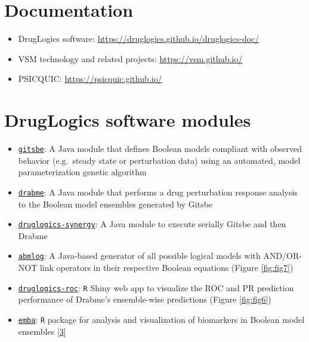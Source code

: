 \documentclass[
  12pt,
]{book}
\providecommand{\tightlist}{%
  \setlength{\itemsep}{0pt}\setlength{\parskip}{0pt}}
\begin{document}
\hypertarget{doc-links}{%
\section*{Documentation}\label{doc-links}}

\begin{itemize}
\tightlist
\item
  DrugLogics software: \url{https://druglogics.github.io/druglogics-doc/}
\item
  VSM technology and related projects: \url{https://vsm.github.io/}
\item
  PSICQUIC: \url{https://psicquic.github.io/}
\end{itemize}

\hypertarget{druglogics-soft-links}{%
\section*{DrugLogics software modules}\label{druglogics-soft-links}}

\begin{itemize}
\tightlist
\item
  \href{https://github.com/druglogics/gitsbe}{\texttt{gitsbe}}: A Java module that defines Boolean models compliant with observed behavior (e.g.~steady state or perturbation data) using an automated, model parameterization genetic algorithm
\item
  \href{https://github.com/druglogics/drabme}{\texttt{drabme}}: A Java module that performs a drug perturbation response analysis to the Boolean model ensembles generated by Gitsbe
\item
  \href{https://github.com/druglogics/druglogics-synergy}{\texttt{druglogics-synergy}}: A Java module to execute serially Gitsbe and then Drabme
\item
  \href{https://github.com/druglogics/abmlog}{\texttt{abmlog}}: A Java-based generator of all possible logical models with AND/OR-NOT link operators in their respective Boolean equations (Figure \ref{fig:fig7})
\item
  \href{https://github.com/druglogics/druglogics-roc}{\texttt{druglogics-roc}}: \texttt{R} Shiny web app to visualize the ROC and PR prediction performance of Drabme's ensemble-wise predictions (Figure \ref{fig:fig6})
\item
  \href{https://github.com/bblodfon/emba/}{\texttt{emba}}: \texttt{R} package for analysis and visualization of biomarkers in Boolean model ensembles {[}\protect\hyperlink{ref-Zobolas2020}{3}{]}
\end{itemize}
\end{document}
